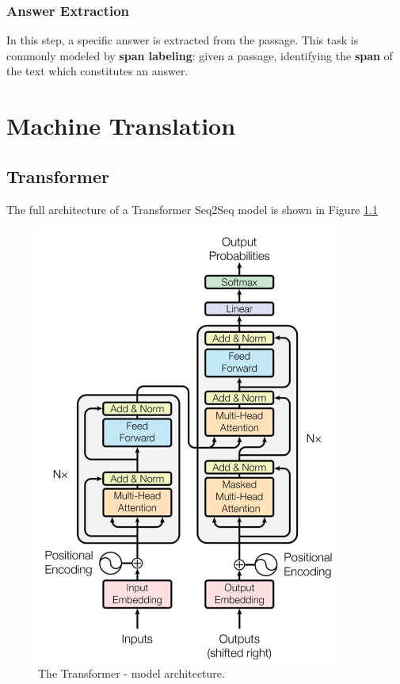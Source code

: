 \documentclass[a3paper, 12pt]{book} %
\begin{document}
\subsection{Answer Extraction}
In this step, a specific answer is extracted from the passage. This task is commonly modeled by \textbf{span labeling}: given a passage, identifying the \textbf{span} of the text which constitutes an answer.


\chapter{Machine Translation}
\section{Transformer}
The full architecture of a Transformer Seq2Seq model is shown in Figure \ref{fig:transformer}
\begin{figure}[htpb]
	\centering
	\includegraphics[width=10cm]{figures/transformer.png}
	\caption{The Transformer - model architecture.}
	\label{fig:transformer}
\end{figure}
\end{document}
